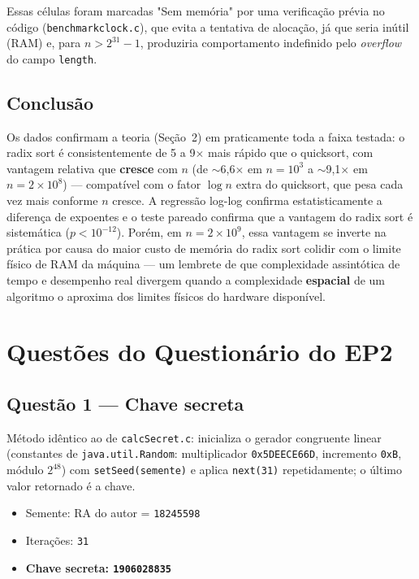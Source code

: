 \documentclass[11pt,a4paper]{article}
\renewcommand{\_}{\underscoreoriginal\allowbreak}
\begin{document}
Essas células foram marcadas "Sem memória" por uma verificação prévia
no código (\texttt{benchmark\_clock.c}), que evita a tentativa de
alocação, já que seria inútil (RAM) e, para $n > 2^{31}-1$, produziria
comportamento indefinido pelo \emph{overflow} do campo \texttt{length}.

\subsection{Conclusão}

Os dados confirmam a teoria (Seção~2) em praticamente toda a faixa
testada: o radix sort é consistentemente de 5 a 9$\times$ mais rápido
que o quicksort, com vantagem relativa que \textbf{cresce} com $n$ (de
$\sim$6,6$\times$ em $n=10^3$ a $\sim$9,1$\times$ em $n=2\times10^8$)
--- compatível com o fator $\log n$ extra do quicksort, que pesa cada
vez mais conforme $n$ cresce. A regressão log-log confirma
estatisticamente a diferença de expoentes e o teste pareado confirma
que a vantagem do radix sort é sistemática ($p<10^{-12}$). Porém, em
$n=2\times10^9$, essa vantagem se inverte na prática por causa do maior
custo de memória do radix sort colidir com o limite físico de RAM da
máquina --- um lembrete de que complexidade assintótica de tempo e
desempenho real divergem quando a complexidade \textbf{espacial} de um
algoritmo o aproxima dos limites físicos do hardware disponível.

\section{Questões do Questionário do EP2}

\subsection{Questão 1 --- Chave secreta}

Método idêntico ao de \texttt{calcSecret.c}: inicializa o gerador
congruente linear (constantes de \texttt{java.util.Random}:
multiplicador \texttt{0x5DEECE66D}, incremento \texttt{0xB}, módulo
$2^{48}$) com \texttt{setSeed(semente)} e aplica \texttt{next(31)}
repetidamente; o último valor retornado é a chave.

\begin{itemize}
  \item Semente: RA do autor = \texttt{18245598}
  \item Iterações: \texttt{31}
  \item \textbf{Chave secreta: \texttt{1906028835}}
\end{itemize}
\end{document}
